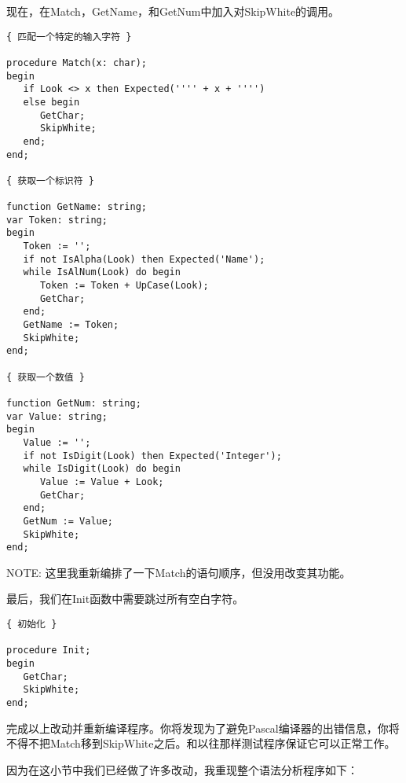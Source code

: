 现在，在Match，GetName，和GetNum中加入对SkipWhite的调用。

\begin{verbatim}
{ 匹配一个特定的输入字符 }

procedure Match(x: char);
begin
   if Look <> x then Expected('''' + x + '''')
   else begin
      GetChar;
      SkipWhite;
   end;
end;

{ 获取一个标识符 }

function GetName: string;
var Token: string;
begin
   Token := '';
   if not IsAlpha(Look) then Expected('Name');
   while IsAlNum(Look) do begin
      Token := Token + UpCase(Look);
      GetChar;
   end;
   GetName := Token;
   SkipWhite;
end;

{ 获取一个数值 }

function GetNum: string;
var Value: string;
begin
   Value := '';
   if not IsDigit(Look) then Expected('Integer');
   while IsDigit(Look) do begin
      Value := Value + Look;
      GetChar;
   end;
   GetNum := Value;
   SkipWhite;
end;
\end{verbatim}

NOTE: 这里我重新编排了一下Match的语句顺序，但没用改变其功能。

最后，我们在Init函数中需要跳过所有空白字符。

\begin{verbatim}
{ 初始化 }

procedure Init;
begin
   GetChar;
   SkipWhite;
end;
\end{verbatim}

完成以上改动并重新编译程序。你将发现为了避免Pascal编译器的出错信息，你将不得不把Match移到SkipWhite之后。和以往那样测试程序保证它可以正常工作。

因为在这小节中我们已经做了许多改动，我重现整个语法分析程序如下：

